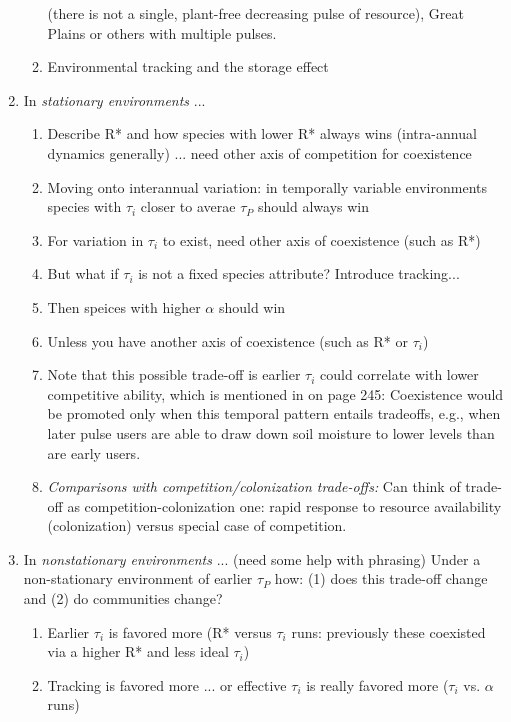 \documentclass[11pt,letterpaper]{article}
\begin{document}
\begin{enumerate}
\begin{enumerate}
  (there is not a single, plant-free decreasing pulse of resource),
  Great Plains or others with multiple pulses.
\item Environmental tracking and the storage effect
\end{enumerate}
\item In \emph{stationary environments} ...
\begin{enumerate}
\item Describe R* and how species with lower R* always wins (intra-annual dynamics generally) ... need other axis of competition for coexistence
\item Moving onto interannual variation: in temporally variable environments species with $\tau_i$ closer to averae $\tau_{P}$ should always win
\item For variation in $\tau_i$ to exist, need other axis of coexistence (such as R*)
\item But what if $\tau_i$ is not a fixed species attribute? Introduce tracking...
\item Then speices with higher $\alpha$ should win
\item Unless you have another axis of coexistence (such as R* or $\tau_i$)
\item Note that this possible trade-off is earlier \(\tau_{i}\) could correlate with lower competitive ability, which is mentioned in \citet{Chesson:2004eo} on page 245: Coexistence would be promoted
only when this temporal pattern entails tradeoffs, e.g.,
when later pulse users are able to draw down soil moisture
to lower levels than are early users.
\item \emph{Comparisons with competition/colonization trade-offs:} Can think of trade-off as competition-colonization one: rapid response to resource availability (colonization) versus special case of competition.\\
\end{enumerate}
\item In \emph{nonstationary environments} ... (need some help with phrasing)
% 
Under a non-stationary environment of earlier $\tau_P$ how: (1) does this trade-off change and (2) do communities change?
\begin{enumerate}
\item Earlier $\tau_i$ is favored more (R* versus $\tau_i$ runs: previously these coexisted via a higher R* and less ideal $\tau_i$)
\item Tracking is favored more ... or effective $\tau_i$ is really favored more ($\tau_i$ vs. $\alpha$ runs)

\end{enumerate}
\end{enumerate}
\end{document}
